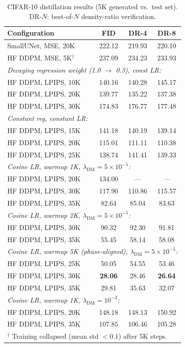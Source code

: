 \documentclass{article}
\theoremstyle{plain}
\theoremstyle{remark}
\begin{document}
\begin{table}[t]
\caption{CIFAR-10 distillation results (5K generated vs.\ test set). DR-$N$: best-of-$N$ density-ratio verification.}
\label{tab:main_results}
\centering
\small
\begin{tabular}{lccc}
\toprule
Configuration & FID & DR-4 & DR-8 \\
\midrule
SmallUNet, MSE, 20K & 222.12 & 219.93 & 220.10 \\
HF DDPM, MSE, 5K$^\dagger$ & 237.09 & 234.23 & 233.93 \\
\midrule
\multicolumn{4}{l}{\textit{Decaying regression weight (1.0 $\to$ 0.3), const LR:}} \\
HF DDPM, LPIPS, 10K & 140.16 & 140.28 & 145.17 \\
HF DDPM, LPIPS, 20K & 139.77 & 135.22 & 137.38 \\
HF DDPM, LPIPS, 30K & 174.83 & 176.77 & 177.48 \\
\midrule
\multicolumn{4}{l}{\textit{Constant reg, constant LR:}} \\
HF DDPM, LPIPS, 15K & 141.18 & 140.19 & 139.14 \\
HF DDPM, LPIPS, 20K & 115.01 & 111.11 & 110.38 \\
HF DDPM, LPIPS, 25K & 138.74 & 141.41 & 139.33 \\
\midrule
\multicolumn{4}{l}{\textit{Cosine LR, warmup 1K, $\lambda_{\text{DM}} = 5{\times}10^{-5}$:}} \\
HF DDPM, LPIPS, 20K & 134.00 & --- & --- \\
HF DDPM, LPIPS, 30K & 117.90 & 110.86 & 115.57 \\
HF DDPM, LPIPS, 35K & 82.64 & 85.04 & 83.63 \\
\midrule
\multicolumn{4}{l}{\textit{Cosine LR, warmup 2K, $\lambda_{\text{DM}} = 5{\times}10^{-5}$:}} \\
HF DDPM, LPIPS, 30K & 90.32 & 92.30 & 91.81 \\
HF DDPM, LPIPS, 35K & 55.45 & 58.14 & 58.08 \\
\midrule
\multicolumn{4}{l}{\textit{Cosine LR, warmup 5K (phase-aligned), $\lambda_{\text{DM}} = 5{\times}10^{-5}$:}} \\
HF DDPM, LPIPS, 25K & 50.05 & 54.55 & 53.46 \\
HF DDPM, LPIPS, 30K & \textbf{28.06} & 28.46 & \textbf{26.64} \\
HF DDPM, LPIPS, 35K & 29.81 & 35.63 & 32.07 \\
\midrule
\multicolumn{4}{l}{\textit{Cosine LR, warmup 1K, $\lambda_{\text{DM}} = 10^{-3}$:}} \\
HF DDPM, LPIPS, 20K & 148.18 & 148.13 & 150.92 \\
HF DDPM, LPIPS, 35K & 107.85 & 106.46 & 105.28 \\
\bottomrule
\multicolumn{4}{l}{\footnotesize $^\dagger$ Training collapsed (mean std $< 0.1$) after 5K steps.}
\end{tabular}
\end{table}
\end{document}
